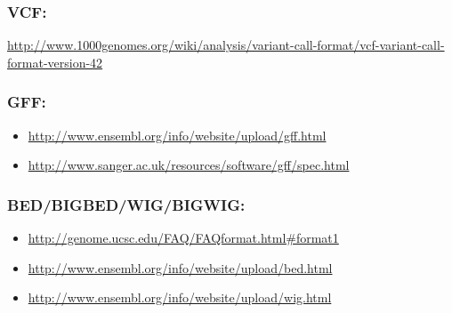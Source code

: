 \documentclass[a4paper,11pt,english]{sphinxmanual}
\begin{document}
\subsubsection{VCF:}
\label{exercises/known_file_formats:vcf}
\href{http://www.1000genomes.org/wiki/analysis/variant-call-format/vcf-variant-call-format-version-42}{http://www.1000genomes.org/wiki/analysis/variant-call-format/vcf-variant-call-format-version-42}


\subsubsection{GFF:}
\label{exercises/known_file_formats:gff}\begin{itemize}
\item {} 
\href{http://www.ensembl.org/info/website/upload/gff.html}{http://www.ensembl.org/info/website/upload/gff.html}

\item {} 
\href{http://www.sanger.ac.uk/resources/software/gff/spec.html}{http://www.sanger.ac.uk/resources/software/gff/spec.html}

\end{itemize}


\subsubsection{BED/BIGBED/WIG/BIGWIG:}
\label{exercises/known_file_formats:bed-bigbed-wig-bigwig}\begin{itemize}
\item {} 
\href{http://genome.ucsc.edu/FAQ/FAQformat.html\#format1}{http://genome.ucsc.edu/FAQ/FAQformat.html\#format1}

\item {} 
\href{http://www.ensembl.org/info/website/upload/bed.html}{http://www.ensembl.org/info/website/upload/bed.html}

\item {} 
\href{http://www.ensembl.org/info/website/upload/wig.html}{http://www.ensembl.org/info/website/upload/wig.html}

\end{itemize}
\end{document}
